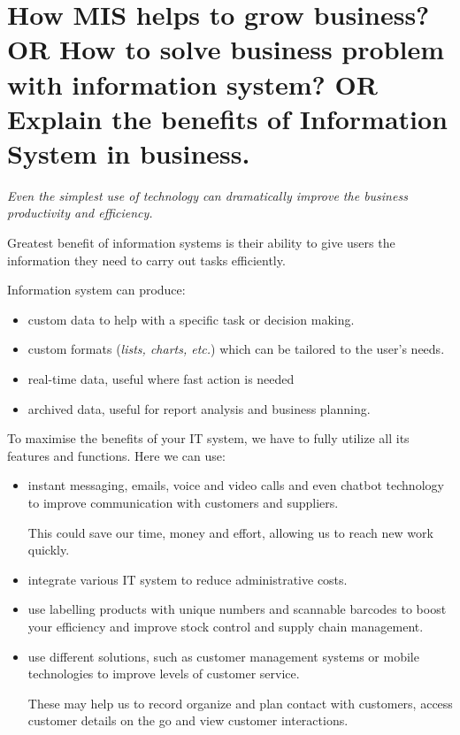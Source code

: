 \documentclass[10pt]{article}
\begin{document}
\newpage
\section{How MIS helps to grow business? OR How to solve business problem with 
information system? OR Explain the benefits of Information System in business.}
\textit{Even the simplest use of technology can dramatically improve the business productivity
and efficiency.} 

Greatest benefit of information systems is their ability to give 
users the information they need to carry out tasks efficiently.

Information system can produce:
\begin{itemize}
  \item custom data to help with a specific task or decision making.

  \item custom formats (\textit{lists, charts, etc.}) which can be tailored to the user's 
    needs.

  \item real-time data, useful where fast action is needed 

  \item archived data, useful for report analysis and business planning.

\end{itemize}

To maximise the benefits of your IT system, we have to fully utilize all its features
and functions. Here we can use:
\begin{itemize}
  \item instant messaging, emails, voice and video calls and even chatbot technology
    to improve communication with customers and suppliers. 

    This could save our time, money
    and effort, allowing us to reach new work quickly.

  \item integrate various IT system to reduce administrative costs.

  \item use labelling products with unique numbers and scannable barcodes to boost your 
    efficiency and improve stock control and supply chain management.

  \item use different solutions, such as customer management systems or mobile technologies
    to improve levels of customer service.

    These may help us to record organize and plan 
    contact with customers, access customer details on the go and view customer interactions.
  
\end{itemize}
\end{document}
